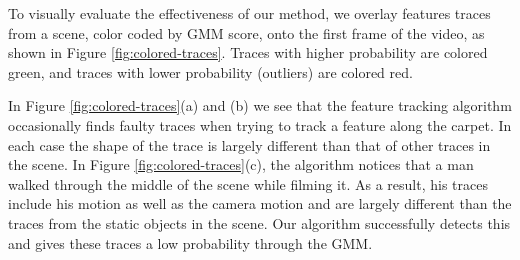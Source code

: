 To visually evaluate the effectiveness of our method, we overlay features traces 
from a scene, color coded by GMM score, onto the first frame of the video, as shown
 in Figure \ref{fig:colored-traces}.  Traces with
higher probability are colored green, and traces with lower probability (outliers) are
colored red. 

In Figure \ref{fig:colored-traces}(a) and (b) we see that the feature tracking
algorithm occasionally finds faulty traces when trying to track a feature along
the carpet.  In each case the shape of the trace is largely
different than that of other traces in the scene.  In Figure
\ref{fig:colored-traces}(c), the algorithm notices that a man walked through
the middle of the scene while filming it.  As a result, his traces include his
motion as well as the camera motion and are largely different than the traces
from the static objects in the scene.  Our algorithm successfully detects this
and gives these traces a low probability through the GMM.

